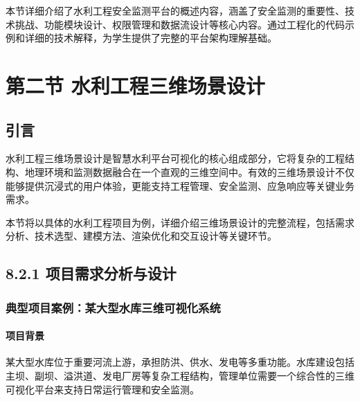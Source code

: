本节详细介绍了水利工程安全监测平台的概述内容，涵盖了安全监测的重要性、技术挑战、功能模块设计、权限管理和数据流设计等核心内容。通过工程化的代码示例和详细的技术解释，为学生提供了完整的平台架构理解基础。

\hypertarget{ux7b2cux4e8cux8282-ux6c34ux5229ux5de5ux7a0bux4e09ux7ef4ux573aux666fux8bbeux8ba1}{%
\section{第二节 水利工程三维场景设计}\label{ux7b2cux4e8cux8282-ux6c34ux5229ux5de5ux7a0bux4e09ux7ef4ux573aux666fux8bbeux8ba1}}

\hypertarget{ux5f15ux8a00-1}{%
\subsection{引言}\label{ux5f15ux8a00-1}}

水利工程三维场景设计是智慧水利平台可视化的核心组成部分，它将复杂的工程结构、地理环境和监测数据融合在一个直观的三维空间中。有效的三维场景设计不仅能够提供沉浸式的用户体验，更能支持工程管理、安全监测、应急响应等关键业务需求。

本节将以具体的水利工程项目为例，详细介绍三维场景设计的完整流程，包括需求分析、技术选型、建模方法、渲染优化和交互设计等关键环节。

\hypertarget{ux9879ux76eeux9700ux6c42ux5206ux6790ux4e0eux8bbeux8ba1}{%
\subsection{8.2.1 项目需求分析与设计}\label{ux9879ux76eeux9700ux6c42ux5206ux6790ux4e0eux8bbeux8ba1}}

\hypertarget{ux5178ux578bux9879ux76eeux6848ux4f8bux67d0ux5927ux578bux6c34ux5e93ux4e09ux7ef4ux53efux89c6ux5316ux7cfbux7edf}{%
\subsubsection{典型项目案例：某大型水库三维可视化系统}\label{ux5178ux578bux9879ux76eeux6848ux4f8bux67d0ux5927ux578bux6c34ux5e93ux4e09ux7ef4ux53efux89c6ux5316ux7cfbux7edf}}

\hypertarget{ux9879ux76eeux80ccux666f}{%
\paragraph{项目背景}\label{ux9879ux76eeux80ccux666f}}

某大型水库位于重要河流上游，承担防洪、供水、发电等多重功能。水库建设包括主坝、副坝、溢洪道、发电厂房等复杂工程结构，管理单位需要一个综合性的三维可视化平台来支持日常运行管理和安全监测。

